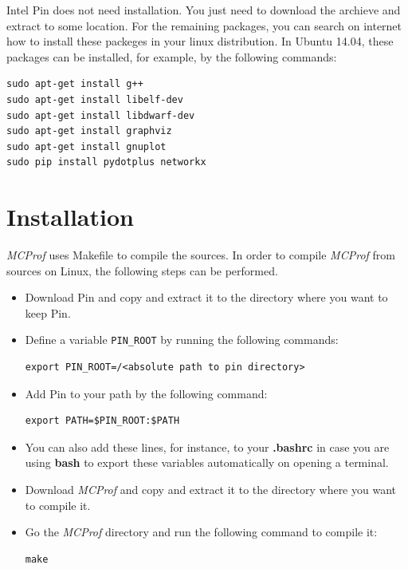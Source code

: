 \documentclass[10pt]{article}
\newcommand{\MCPROF}{\emph{MCProf}}
\begin{document}
Intel Pin does not need installation. You just need to download the archieve and 
extract to some location. For the remaining packages, you can search on internet 
how to install these packeges in your linux distribution. In Ubuntu 14.04, these 
packages can be installed, for example, by the following commands:

{
\small
\begin{Verbatim}[frame=single, samepage=true]
sudo apt-get install g++
sudo apt-get install libelf-dev
sudo apt-get install libdwarf-dev
sudo apt-get install graphviz
sudo apt-get install gnuplot
sudo pip install pydotplus networkx
\end{Verbatim}
}



\section{Installation}
\label{sec:installation}

\MCPROF{} uses Makefile to compile the sources. In order to compile \MCPROF{}
from sources on Linux, the following steps can be performed.

\begin{itemize}

\item Download Pin and copy and extract it to the directory where you want to
    keep Pin.

\item Define a variable \verb|PIN_ROOT| by running the following commands:

{
\small
\begin{Verbatim}[frame=single]
export PIN_ROOT=/<absolute path to pin directory>
\end{Verbatim}
}

\item Add Pin to your path by the following command:
{
\small
\begin{Verbatim}[frame=single]
export PATH=$PIN_ROOT:$PATH
\end{Verbatim}
}

\item You can also add these lines, for instance, to your \textbf{.bashrc} in case
    you are using \textbf{bash} to export these variables automatically on opening
    a terminal.

\item Download \MCPROF{} and copy and extract it to the directory where you want
    to compile it.

\item Go the \MCPROF{} directory and run the following command to compile it:

{
\small
\begin{Verbatim}[frame=single]
make
\end{Verbatim}
}

\end{itemize}
\end{document}
